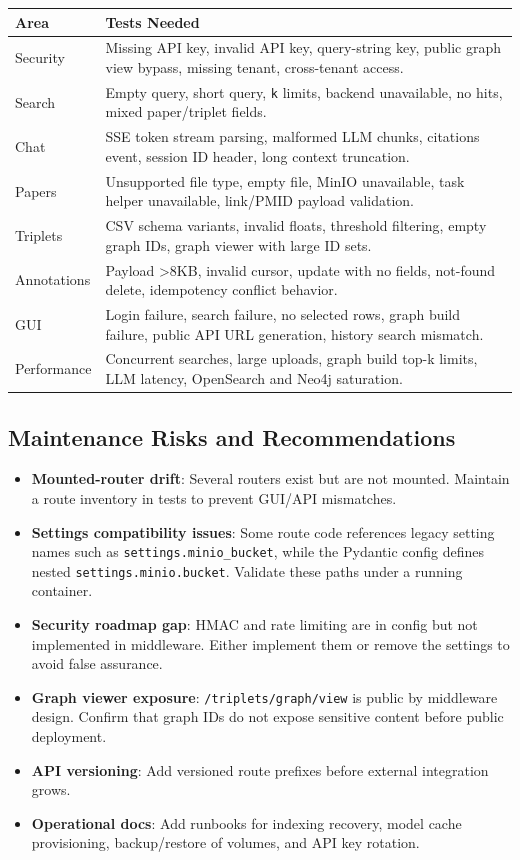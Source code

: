 \documentclass[10pt,letterpaper]{article}
\begin{document}
\begin{scriptsize}
\begin{longtable}{>{\raggedright\arraybackslash}p{3.35in}>{\raggedright\arraybackslash}p{3.35in}}
Area & Tests Needed \\
\hline
Security & Missing API key, invalid API key, query-string key, public graph view bypass, missing tenant, cross-tenant access. \\
Search & Empty query, short query, \texttt{k} limits, backend unavailable, no hits, mixed paper/triplet fields. \\
Chat & SSE token stream parsing, malformed LLM chunks, citations event, session ID header, long context truncation. \\
Papers & Unsupported file type, empty file, MinIO unavailable, task helper unavailable, link/PMID payload validation. \\
Triplets & CSV schema variants, invalid floats, threshold filtering, empty graph IDs, graph viewer with large ID sets. \\
Annotations & Payload >8KB, invalid cursor, update with no fields, not-found delete, idempotency conflict behavior. \\
GUI & Login failure, search failure, no selected rows, graph build failure, public API URL generation, history search mismatch. \\
Performance & Concurrent searches, large uploads, graph build top-k limits, LLM latency, OpenSearch and Neo4j saturation. \\
\end{longtable}
\end{scriptsize}

\subsection{Maintenance Risks and Recommendations}

\begin{itemize}
\item \textbf{Mounted-router drift}: Several routers exist but are not mounted. Maintain a route inventory in tests to prevent GUI/API mismatches.
\item \textbf{Settings compatibility issues}: Some route code references legacy setting names such as \texttt{settings.minio\_bucket}, while the Pydantic config defines nested \texttt{settings.minio.bucket}. Validate these paths under a running container.
\item \textbf{Security roadmap gap}: HMAC and rate limiting are in config but not implemented in middleware. Either implement them or remove the settings to avoid false assurance.
\item \textbf{Graph viewer exposure}: \texttt{/triplets/graph/view} is public by middleware design. Confirm that graph IDs do not expose sensitive content before public deployment.
\item \textbf{API versioning}: Add versioned route prefixes before external integration grows.
\item \textbf{Operational docs}: Add runbooks for indexing recovery, model cache provisioning, backup/restore of volumes, and API key rotation.
\end{itemize}
\end{document}

